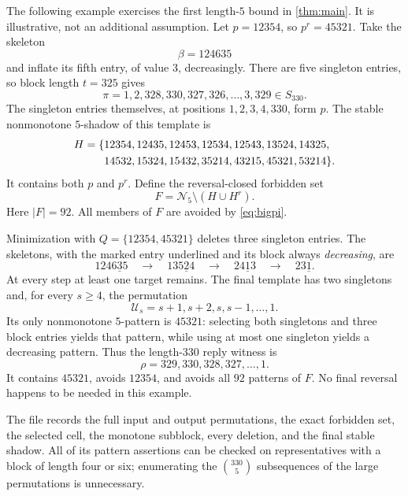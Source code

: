 \documentclass[11pt,a4paper]{article}
\theoremstyle{definition}
\theoremstyle{remark}
\newcommand{\Um}{\mathcal U}
\newcommand{\code}[1]{\texttt{\detokenize{#1}}}
\begin{document}
The following example exercises the first length-$5$ bound in
\cref{thm:main}. It is illustrative, not an additional assumption.
Let $p=12354$, so $p^r=45321$. Take the skeleton
\[
 \beta=124635
\]
and inflate its fifth entry, of value $3$, decreasingly. There are five
singleton entries, so block length $t=325$ gives
\begin{equation}\label{eq:bigpi}
 \pi=1,2,328,330,327,326,\ldots,3,329\in S_{330}.
\end{equation}
The singleton entries themselves, at positions $1,2,3,4,330$, form $p$.
The stable nonmonotone $5$-shadow of this template is
\begin{align*}
 H=\{&12354,12435,12453,12534,12543,13524,14325,\notag\\
     &14532,15324,15432,35214,43215,45321,53214\}.
\end{align*}
It contains both $p$ and $p^r$. Define the reversal-closed forbidden set
\[
 F=\mathcal N_5\setminus(H\cup H^r).
\]
Here $|F|=92$. All members of $F$ are avoided by \eqref{eq:bigpi}.

Minimization with $Q=\{12354,45321\}$ deletes three singleton entries.
The skeletons, with the marked entry underlined and its block always
\emph{decreasing}, are
\begin{equation}\label{eq:trace}
 1246\underline{3}5
 \quad\longrightarrow\quad
 135\underline{2}4
 \quad\longrightarrow\quad
 24\underline{1}3
 \quad\longrightarrow\quad
 23\underline{1}.
\end{equation}
At every step at least one target remains. The final template has two
singletons and, for every $s\ge4$, the permutation
\[
 \Um_s=s+1,s+2,s,s-1,\ldots,1.
\]
Its only nonmonotone $5$-pattern is $45321$: selecting both singletons and
three block entries yields that pattern, while using at most one singleton
yields a decreasing pattern. Thus the length-$330$ reply witness is
\begin{equation}\label{eq:rho330}
 \rho=329,330,328,327,\ldots,1.
\end{equation}
It contains $45321$, avoids $12354$, and avoids all $92$ patterns of $F$.
No final reversal happens to be needed in this example.

The file \code{data/worked_certificate.json} records the full input and
output permutations, the exact forbidden set, the selected cell, the
monotone subblock, every deletion, and the final stable shadow. All of its
pattern assertions can be checked on representatives with a block of length
four or six; enumerating the $\binom{330}{5}$ subsequences of the large
permutations is unnecessary.
\end{document}
